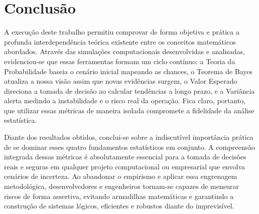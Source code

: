 \section{Conclusão}
\label{cap:conclusao}

A execução deste trabalho permitiu comprovar de forma objetiva e prática a profunda interdependência teórica existente entre os conceitos matemáticos abordados. Através das simulações computacionais desenvolvidas e analisadas, evidenciou-se que essas ferramentas formam um ciclo contínuo: a Teoria da Probabilidade baseia o cenário inicial mapeando as chances, o Teorema de Bayes atualiza a nossa visão assim que novas evidências surgem, o Valor Esperado direciona a tomada de decisão ao calcular tendências a longo prazo, e a Variância alerta medindo a instabilidade e o risco real da operação. Fica claro, portanto, que utilizar essas métricas de maneira isolada compromete a fidelidade da análise estatística.

Diante dos resultados obtidos, conclui-se sobre a indiscutível importância prática de se dominar esses quatro fundamentos estatísticos em conjunto. A compreensão integrada dessas métricas é absolutamente essencial para a tomada de decisões reais e seguras em qualquer projeto computacional ou empresarial que envolva cenários de incerteza. Ao abandonar o empirismo e aplicar essa engrenagem metodológica, desenvolvedores e engenheiros tornam-se capazes de mensurar riscos de forma assertiva, evitando armadilhas matemáticas e garantindo a construção de sistemas lógicos, eficientes e robustos diante do imprevisível.

